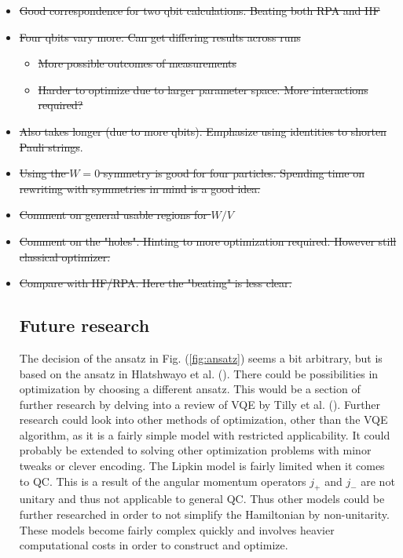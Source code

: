 \begin{itemize}
    \item \st{Good correspondence for two qbit calculations. Beating both RPA and HF} 
    \item \st{Four qbits vary more. Can get differing results across runs} \begin{itemize}
        \item \st{More possible outcomes of measurements}
        \item \st{Harder to optimize due to larger parameter space. More interactions required?}
    \end{itemize}  
    \item \st{Also takes longer (due to more qbits). Emphasize using identities to shorten Pauli strings}.
    \item \st{Using the $W=0$ symmetry is good for four particles. Spending time on rewriting with symmetries in mind is a good idea.} 
    \item \st{Comment on general usable regions for $W/V$}
    \item \st{Comment on the "holes". Hinting to more optimization required. However still classical optimizer.} 
    \item \st{Compare with HF/RPA. Here the "beating" is less clear.}
    
\subsection{Future research}
The decision of the ansatz in Fig. (\ref{fig:ansatz}) seems a bit arbitrary, but is based on the ansatz in Hlatshwayo et al. (\cite{hlatshwayoSimulatingExcitedStates2022}). There could be possibilities in optimization by choosing a different ansatz. This would be a section of further research by delving into a review of VQE by Tilly et al. (\cite{VQE_review}). \newline 
Further research could look into other methods of optimization, other than the VQE algorithm, as it is a fairly simple model with restricted applicability. It could probably be extended to solving other optimization problems with minor tweaks or clever encoding. The Lipkin model is fairly limited when it comes to QC. This is a result of the angular momentum operators $j_+$ and $j_-$ are not unitary and thus not applicable to general QC. Thus other models could be further researched in order to not simplify the Hamiltonian by non-unitarity. These models become fairly complex quickly and involves heavier computational costs in order to construct and optimize.  
\end{itemize}
